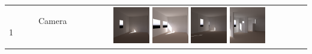 \documentclass[landscape,20pt]{sciposter}
\begin{document}
\begin{minipage}[t]{17in}

\begin{tabular}{lc}
\begin{sideways}~~~~~~~Camera 1\end{sideways}&
  \includegraphics[width=0.158\textwidth]{../gi2012_userstudy/images/renderings/renovations/065_camera_chris_march.png}
  \includegraphics[width=0.158\textwidth]{../gi2012_userstudy/images/renderings/renovations/065_camera_chris_march_mod.png}
  \includegraphics[width=0.158\textwidth]{../gi2012_userstudy/images/renderings/renovations/user_046_camera_chris_march.png}
  \includegraphics[width=0.158\textwidth]{../gi2012_userstudy/images/renderings/renovations/user_046_camera_chris_march_mod.png}

\end{tabular}
\end{minipage}
\end{document}
